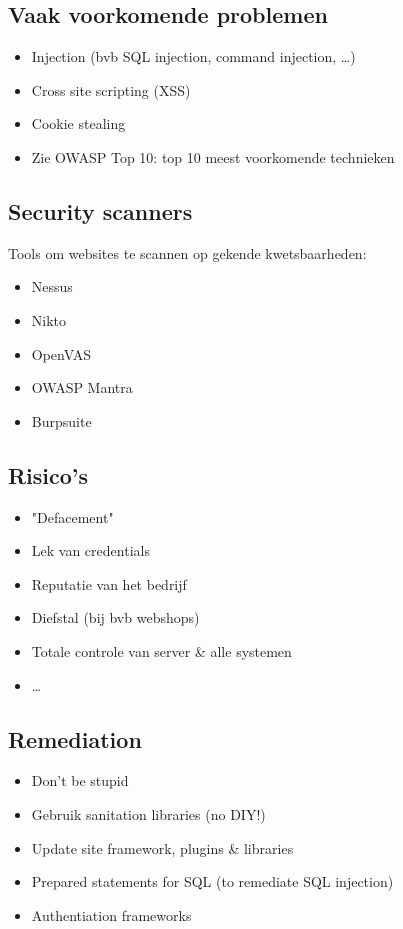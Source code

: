 \documentclass{article}
\begin{document}
\subsection{Vaak voorkomende problemen}

\begin{itemize}
    \item Injection (bvb SQL injection, command injection, \dots)
    \item Cross site scripting (XSS)
    \item Cookie stealing
    \item Zie OWASP Top 10: top 10 meest voorkomende technieken
\end{itemize}

\subsection{Security scanners}

Tools om websites te scannen op gekende kwetsbaarheden:

\begin{itemize}
    \item Nessus
    \item Nikto
    \item OpenVAS
    \item OWASP Mantra
    \item Burpsuite
\end{itemize}

\subsection{Risico's}

\begin{itemize}
    \item "Defacement"
    \item Lek van credentials
    \item Reputatie van het bedrijf
    \item Diefstal (bij bvb webshops)
    \item Totale controle van server \& alle systemen
    \item \dots
\end{itemize}

\subsection{Remediation}

\begin{itemize}
    \item Don't be stupid
    \item Gebruik sanitation libraries (no DIY!)
    \item Update site framework, plugins \& libraries
    \item Prepared statements for SQL (to remediate SQL injection)
    \item Authentiation frameworks
\end{itemize}
\end{document}
